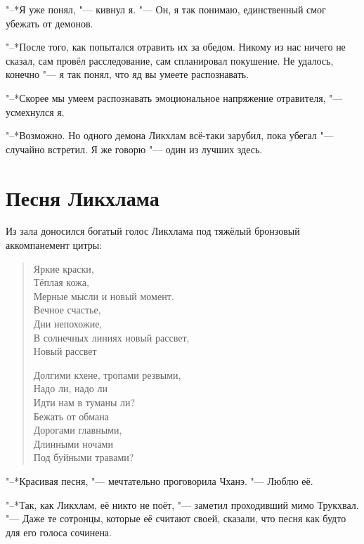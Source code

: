 \documentclass[a4paper,10pt]{book}
\newcommand{\mulang}[3]{#2}%
\newcommand{\ldotst}{\so{...}\xspace}
\begin{document}
"--*Я уже понял, "--- кивнул я. "--- Он, я так понимаю, единственный смог 
убежать от демонов.

"--*После того, как попытался отравить их за обедом. Никому из нас ничего не 
сказал,
сам провёл расследование, сам спланировал покушение. Не удалось, конечно "---
я так понял, что яд вы умеете распознавать.

"--*Скорее мы умеем распознавать эмоциональное напряжение отравителя, "--- 
усмехнулся я.

"--*Возможно. Но одного демона Ликхлам всё-таки зарубил, пока убегал "--- 
случайно встретил.
Я же говорю "--- один из лучших здесь.

\section{Песня Ликхлама}

Из зала доносился богатый голос Ликхлама под тяжёлый бронзовый аккомпанемент цитры:

\begin{verse}
\mulang{}{Яркие краски,}{Brightness of colors,}\\
\mulang{}{Тёплая кожа,}{Skin heated by arteries,}\\
\mulang{}{Мерные мысли и новый момент.}{Race of new moments, and rhythmical minds. }\\
\mulang{}{Вечное счастье,}{Edgeless happiness,}\\
\mulang{}{Дни непохожие,}{Different afternoons,}\\
\mulang{}{В солнечных линиях новый рассвет,}{Covered by sun rays renewed sunrise,}\\
\mulang{}{Новый рассвет\ldotst}{Renewed sunrise\dots}

Долгими кхене, тропами резвыми,\\
Надо ли, надо ли\\
Идти нам в туманы ли?\\
Бежать от обмана\\
Дорогами главными,\\
Длинными ночами\\
Под буйными травами?
\end{verse}

"--*Красивая песня, "--- мечтательно проговорила Чханэ. "--- Люблю её.

"--*Так, как Ликхлам, её никто не поёт, "--- заметил проходивший мимо Трукхвал.
"--- Даже те сотронцы, которые её считают своей, сказали, что песня как будто для
его голоса сочинена.
\end{document}
